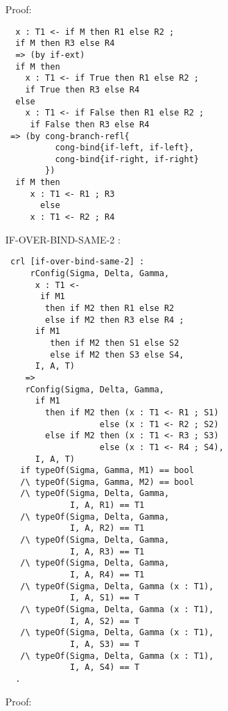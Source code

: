 \documentclass{article}
\begin{document}
\begin{itemize}
\begin{lstlisting}
\end{lstlisting}  

Proof:

 \begin{lstlisting}
  x : T1 <- if M then R1 else R2 ; 
  if M then R3 else R4
  => (by if-ext)
  if M then 
    x : T1 <- if True then R1 else R2 ; 
    if True then R3 else R4
  else
    x : T1 <- if False then R1 else R2 ; 
     if False then R3 else R4
 => (by cong-branch-refl{
          cong-bind{if-left, if-left}, 
          cong-bind{if-right, if-right}
        })
  if M then 
     x : T1 <- R1 ; R3
       else
     x : T1 <- R2 ; R4       
 \end{lstlisting}

\item[IF-OVER-BIND-SAME-2]:
\begin{lstlisting}                    
 crl [if-over-bind-same-2] :
     rConfig(Sigma, Delta, Gamma, 
      x : T1 <- 
       if M1 
        then if M2 then R1 else R2
        else if M2 then R3 else R4 ;
      if M1 
         then if M2 then S1 else S2
         else if M2 then S3 else S4,
      I, A, T)
    => 
    rConfig(Sigma, Delta, Gamma, 
      if M1 
        then if M2 then (x : T1 <- R1 ; S1) 
                   else (x : T1 <- R2 ; S2)
        else if M2 then (x : T1 <- R3 ; S3) 
                   else (x : T1 <- R4 ; S4),          
      I, A, T) 
   if typeOf(Sigma, Gamma, M1) == bool
   /\ typeOf(Sigma, Gamma, M2) == bool 
   /\ typeOf(Sigma, Delta, Gamma, 
             I, A, R1) == T1
   /\ typeOf(Sigma, Delta, Gamma, 
             I, A, R2) == T1
   /\ typeOf(Sigma, Delta, Gamma, 
             I, A, R3) == T1     
   /\ typeOf(Sigma, Delta, Gamma, 
             I, A, R4) == T1  
   /\ typeOf(Sigma, Delta, Gamma (x : T1), 
             I, A, S1) == T                                
   /\ typeOf(Sigma, Delta, Gamma (x : T1), 
             I, A, S2) == T
   /\ typeOf(Sigma, Delta, Gamma (x : T1), 
             I, A, S3) == T
   /\ typeOf(Sigma, Delta, Gamma (x : T1), 
             I, A, S4) == T 
  .                                                  

\end{lstlisting}    
  
Proof:


\end{itemize}
\end{document}
